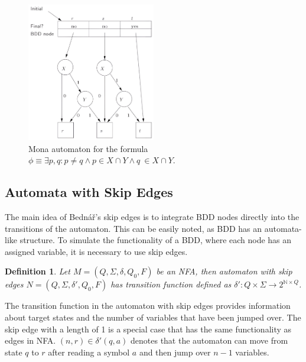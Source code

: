 \documentclass[pdflatex,sn-mathphys-num]{sn-jnl}%
\theoremstyle{thmstyleone}%
\theoremstyle{thmstyletwo}%
\theoremstyle{thmstylethree}%
\newtheorem{definition}{Definition}%
\begin{document}
        \begin{figure}[h]
            \centering
            \includegraphics[width=0.5\textwidth]{Figures/mona_aut.png}
            \vspace*{0.5em}
            \caption{Mona automaton for the formula $\phi \equiv \exists p, q : p \neq q \land p \in X \cap Y \land q \ \in X \cap Y$.}
            \label{fig:mona}
        \end{figure}

        \vspace*{-2em}

    \subsection{Automata with Skip Edges}
        The main idea of Bednář's skip edges \cite{Bednar} is to integrate BDD nodes directly into the transitions of the automaton. This can be easily noted, as BDD has an automata-like structure. To simulate the functionality of a BDD, where each node has an assigned variable, it is necessary to use skip edges.

        \vspace*{0.5em}

        \begin{definition}
            Let $M = (Q, \Sigma, \delta, Q_0, F)$ be an NFA, then automaton with skip edges $N = (Q, \Sigma, \delta', Q_0, F)$ has transition function defined as $\delta' : Q \times \Sigma \rightarrow 2^{\mathbb{N} \times Q}$.
        \end{definition}

        \vspace*{0.5em}

        The transition function in the automaton with skip edges provides information about target states and the number of variables that have been jumped over. The skip edge with a length of 1 is a special case that has the same functionality as edges in NFA. $(n, r) \in \delta'(q, a)$ denotes that the automaton can move from state $q$ to $r$ after reading a symbol $a$ and then jump over $n-1$ variables.
\end{document}

